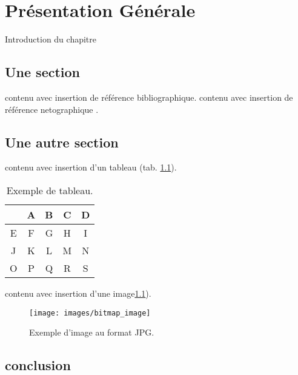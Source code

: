 \chapter{Présentation Générale}
\label{chap:premierchapitre}


Introduction du chapitre
\section{Une section}

 contenu avec insertion de référence bibliographique\cite{ref1}.
 contenu avec insertion de référence netographique .


\section{Une autre section}

 contenu avec insertion d'un tableau (tab. \ref{tab:un-tableau}).

\begin{table}[ht]
  \begin{center}
    \begin{tabular}{|c|c|c|c|c|}
      \hline
      & A & B& C& D \\
      \hline
      E & F& G & H &I \\
      \hline
      J & K& L & M & N\\
      \hline
     O& P & Q & R& S\\
      \hline
    \end{tabular}
    \caption{Exemple de tableau.}
    \label{tab:un-tableau}
  \end{center}
\end{table}

contenu avec insertion d'une image\ref{fig:une-autre-image}).

\begin{figure}[htp]
  \centering
  \texttt{[image: images/bitmap\_image]}
  \caption{Exemple d'image au format JPG.}
  \label{fig:une-autre-image}
\end{figure}

\section{conclusion}

